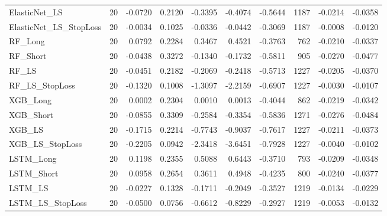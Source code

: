 \begin{tabular}{llrrrrrrrr}
\cline{1-10}
ElasticNet\_LS & 20 & -0.0720 & 0.2120 & -0.3395 & -0.4074 & -0.5644 & 1187 & -0.0214 & -0.0358 \\
\cline{1-10}
ElasticNet\_LS\_StopLoss & 20 & -0.0034 & 0.1025 & -0.0336 & -0.0442 & -0.3069 & 1187 & -0.0008 & -0.0120 \\
\cline{1-10}
RF\_Long & 20 & 0.0792 & 0.2284 & 0.3467 & 0.4521 & -0.3763 & 762 & -0.0210 & -0.0337 \\
\cline{1-10}
RF\_Short & 20 & -0.0438 & 0.3272 & -0.1340 & -0.1732 & -0.5811 & 905 & -0.0270 & -0.0477 \\
\cline{1-10}
RF\_LS & 20 & -0.0451 & 0.2182 & -0.2069 & -0.2418 & -0.5713 & 1227 & -0.0205 & -0.0370 \\
\cline{1-10}
RF\_LS\_StopLoss & 20 & -0.1320 & 0.1008 & -1.3097 & -2.2159 & -0.6907 & 1227 & -0.0030 & -0.0107 \\
\cline{1-10}
XGB\_Long & 20 & 0.0002 & 0.2304 & 0.0010 & 0.0013 & -0.4044 & 862 & -0.0219 & -0.0342 \\
\cline{1-10}
XGB\_Short & 20 & -0.0855 & 0.3309 & -0.2584 & -0.3354 & -0.5836 & 1271 & -0.0276 & -0.0484 \\
\cline{1-10}
XGB\_LS & 20 & -0.1715 & 0.2214 & -0.7743 & -0.9037 & -0.7617 & 1227 & -0.0211 & -0.0373 \\
\cline{1-10}
XGB\_LS\_StopLoss & 20 & -0.2205 & 0.0942 & -2.3418 & -3.6451 & -0.7928 & 1227 & -0.0040 & -0.0102 \\
\cline{1-10}
LSTM\_Long & 20 & 0.1198 & 0.2355 & 0.5088 & 0.6443 & -0.3710 & 793 & -0.0209 & -0.0348 \\
\cline{1-10}
LSTM\_Short & 20 & 0.0958 & 0.2654 & 0.3611 & 0.4948 & -0.4235 & 800 & -0.0240 & -0.0377 \\
\cline{1-10}
LSTM\_LS & 20 & -0.0227 & 0.1328 & -0.1711 & -0.2049 & -0.3527 & 1219 & -0.0134 & -0.0229 \\
\cline{1-10}
LSTM\_LS\_StopLoss & 20 & -0.0500 & 0.0756 & -0.6612 & -0.8229 & -0.2927 & 1219 & -0.0053 & -0.0132 \\
\cline{1-10}
\bottomrule
\end{tabular}
